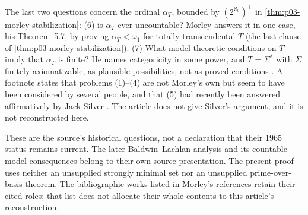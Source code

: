 The last two questions concern the ordinal \(\alpha_T\), bounded by
\((2^{\aleph_0})^+\) in \cref{thm:p03-morley-stabilization}: (6) is
\(\alpha_T\) ever uncountable? Morley answers it in one case, his
Theorem~5.7, by proving \(\alpha_T<\omega_1\) for totally transcendental
\(T\) (the last clause of \cref{thm:p03-morley-stabilization}). (7) What
model-theoretic conditions on \(T\) imply that \(\alpha_T\) is finite? He
names categoricity in some power, and \(T=\Sigma^*\) with \(\Sigma\)
finitely axiomatizable, as plausible possibilities, not as proved
conditions \cite[pp.~537--538]{Morley1965}. A footnote states that
problems (1)--(4) are not Morley's own but seem to have been
considered by several people, and that (5) had recently been answered
affirmatively by Jack Silver \cite[p.~537, n.~25]{Morley1965}. The article
does not give Silver's argument, and it is not reconstructed here.

These are the source's historical questions, not a declaration
that their 1965 status remains current. The later Baldwin--Lachlan
analysis and its countable-model consequences belong to their
own source presentation. The present proof uses neither an
unsupplied strongly minimal set nor an unsupplied prime-over-basis
theorem. The bibliographic works listed in Morley's references
retain their cited roles; that list does not allocate their whole
contents to this article's reconstruction.
